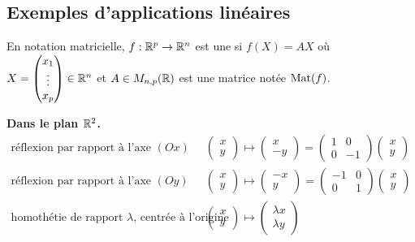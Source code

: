 \documentclass[10pt,class=article,crop=false]{standalone}
\begin{document}
\begin{multicols}{2}
\subsection{Exemples d'applications linéaires}

En notation matricielle, $f : \mathbb{R}^p \to \mathbb{R}^n$ est une  si
$f(X)=AX$ où
$X= \begin{pmatrix} x_1\\ \vdots \\x_p \end{pmatrix} \in \mathbb{R}^n$ et
$A \in M_{n,p}(\mathbb{R})$ est une matrice notée  $\operatorname{Mat}(f)$.



\textbf{Dans le plan \(\mathbb{R}^2\).}
\[
\begin{array}{ll}
\text{réflexion par rapport à l'axe $(Ox)$} &
\begin{pmatrix} x \\ y \end{pmatrix} \mapsto \begin{pmatrix} x \\ -y \end{pmatrix}
= \begin{pmatrix} 1 & 0 \\ 0 & -1 \end{pmatrix} \begin{pmatrix} x \\ y \end{pmatrix}
\\[2em]
\text{réflexion par rapport à l'axe $(Oy)$} &
\begin{pmatrix} x \\ y \end{pmatrix} \mapsto \begin{pmatrix} -x \\ y \end{pmatrix}
= \begin{pmatrix} -1 & 0 \\ 0 & 1 \end{pmatrix} \begin{pmatrix} x \\ y \end{pmatrix}
\\[2em]
\text{homothétie de rapport \(\lambda\), centrée à l'origine} &
\begin{pmatrix} x \\ y \end{pmatrix} \mapsto \begin{pmatrix} \lambda x \\ \lambda y \end{pmatrix}

\end{array}\]
\end{multicols}
\end{document}
